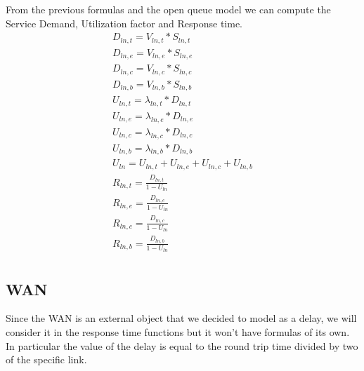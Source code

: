 \documentclass[11pt]{article}
\begin{document}
From the previous formulas and the open queue model we can compute the Service Demand, Utilization factor and Response time.
\begin{equation}
    \begin{array}{l}
        D_{ln, t} = V_{ln, t} * S_{ln, t} \\
        D_{ln, e} = V_{ln, e} * S_{ln, e} \\
        D_{ln, c} = V_{ln, c} * S_{ln, c} \\
        D_{ln, b} = V_{ln, b} * S_{ln, b} \\
        U_{ln, t} = \lambda_{ln, t} * D_{ln, t} \\
        U_{ln, e} = \lambda_{ln, e} * D_{ln, e} \\
        U_{ln, c} = \lambda_{ln, c} * D_{ln, c} \\
        U_{ln, b} = \lambda_{ln, b} * D_{ln, b} \\
        U_{ln} = U_{ln, t} + U_{ln, e} + U_{ln, c} + U_{ln, b} \\
        R_{ln, t} = \frac{D_{ln, t}}{1 - U_{ln}} \\
        R_{ln, e} = \frac{D_{ln, e}}{1 - U_{ln}} \\
        R_{ln, c} = \frac{D_{ln, c}}{1 - U_{ln}} \\
        R_{ln, b} = \frac{D_{ln, b}}{1 - U_{ln}} \\
    \end{array}
\end{equation}
\subsection{WAN}
Since the WAN is an external object that we decided to model as a delay, we will consider it in the response time functions but it won't have formulas of its own. In particular the value of the delay is equal to the round trip time divided by two of the specific link.
\end{document}

